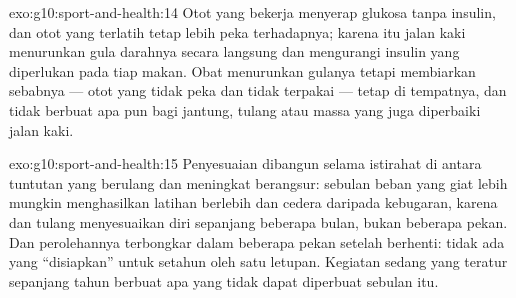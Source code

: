 \begin{solution}{exo:g10:sport-and-health:14}
Otot yang bekerja menyerap glukosa tanpa insulin, dan otot yang
terlatih tetap lebih peka terhadapnya; karena itu jalan kaki
menurunkan gula darahnya secara langsung dan mengurangi insulin yang
diperlukan pada tiap makan. Obat menurunkan gulanya tetapi membiarkan
sebabnya --- otot yang tidak peka dan tidak terpakai --- tetap di
tempatnya, dan tidak berbuat apa pun bagi jantung, tulang atau massa
yang juga diperbaiki jalan kaki.
\end{solution}

\begin{solution}{exo:g10:sport-and-health:15}
Penyesuaian dibangun selama istirahat di antara tuntutan yang berulang
dan meningkat berangsur: sebulan beban yang giat lebih mungkin
menghasilkan latihan berlebih dan cedera daripada kebugaran, karena
 dan tulang menyesuaikan diri sepanjang beberapa bulan, bukan
beberapa pekan. Dan perolehannya terbongkar dalam beberapa pekan
setelah berhenti: tidak ada yang ``disiapkan'' untuk setahun oleh satu
letupan. Kegiatan sedang yang teratur sepanjang tahun berbuat apa yang
tidak dapat diperbuat sebulan itu.
\end{solution}

